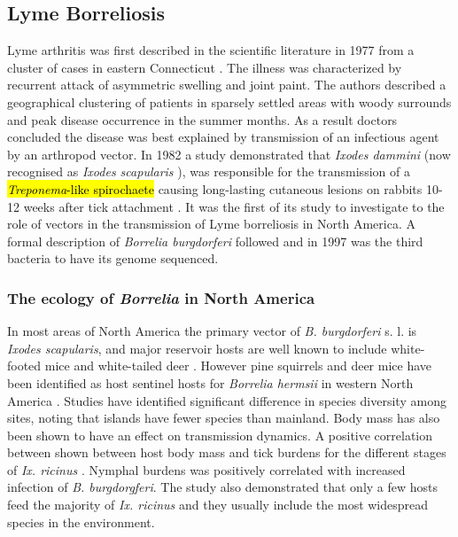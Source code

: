 \documentclass[a4paper, nobind]{templates/ociamthesis}
\begin{document}
\hypertarget{lyme-borreliosis}{%
\subsection{Lyme Borreliosis}\label{lyme-borreliosis}}

Lyme arthritis was first described in the scientific literature in 1977 from a cluster of cases in eastern Connecticut \autocite{steereLymeArthritisEpidemic1977}.
The illness was characterized by recurrent attack of asymmetric swelling and joint paint.
The authors described a geographical clustering of patients in sparsely settled areas with woody surrounds and peak disease occurrence in the summer months.
As a result doctors concluded the disease was best explained by transmission of an infectious agent by an arthropod vector.
In 1982 a study demonstrated that \emph{Ixodes dammini} (now recognised as \emph{Ixodes scapularis} \autocite{sandersIxodesDamminiJunior1998}), was responsible for the transmission of a \hl{\emph{Treponema}-like spirochaete} causing long-lasting cutaneous lesions on rabbits 10-12 weeks after tick attachment \autocite{burgdorferLymeDiseaseTickborne1982}.
It was the first of its study to investigate to the role of vectors in the transmission of Lyme borreliosis in North America.
A formal description of \emph{Borrelia burgdorferi} followed \autocite{johnsonBorreliaBurgdorferiSp1984} and in 1997 \autocite{fraserGenomicSequenceLyme1997} was the third bacteria to have its genome sequenced.

\hypertarget{the-ecology-of-borrelia-in-north-america}{%
\subsubsection{\texorpdfstring{The ecology of \emph{Borrelia} in North America}{The ecology of Borrelia in North America}}\label{the-ecology-of-borrelia-in-north-america}}

In most areas of North America the primary vector of \emph{B. burgdorferi} s. l. is \emph{Ixodes scapularis}, and major reservoir hosts are well known to include white-footed mice and white-tailed deer \autocite{halseyRoleIxodesScapularis2018}.
However pine squirrels and deer mice have been identified as host sentinel hosts for \emph{Borrelia hermsii} in western North America \autocite{cadenasIdentificationHostBloodmeal2007}.
Studies have identified significant difference in species diversity among sites, noting that islands have fewer species than mainland.
Body mass has also been shown to have an effect on transmission dynamics.
A positive correlation between shown between host body mass and tick burdens for the different stages of \emph{Ix. ricinus} \autocite{hofmeesterFewVertebrateSpecies2016}.
Nymphal burdens was positively correlated with increased infection of \emph{B. burgdorgferi}.
The study also demonstrated that only a few hosts feed the majority of \emph{Ix. ricinus} and they usually include the most widespread species in the environment.
\end{document}

